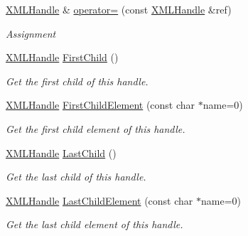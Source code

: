 \begin{DoxyCompactItemize}
\hyperlink{classtinyxml2_1_1_x_m_l_handle}{X\+M\+L\+Handle} \& \hyperlink{classtinyxml2_1_1_x_m_l_handle_a75b908322bb4b83be3281b6845252b20}{operator=} (const \hyperlink{classtinyxml2_1_1_x_m_l_handle}{X\+M\+L\+Handle} \&ref)
\begin{DoxyCompactList}\small\item\em Assignment \end{DoxyCompactList}\item 
\mbox{\label{classtinyxml2_1_1_x_m_l_handle_a536447dc7f54c0cd11e031dad94795ae}} 
\hyperlink{classtinyxml2_1_1_x_m_l_handle}{X\+M\+L\+Handle} \hyperlink{classtinyxml2_1_1_x_m_l_handle_a536447dc7f54c0cd11e031dad94795ae}{First\+Child} ()
\begin{DoxyCompactList}\small\item\em Get the first child of this handle. \end{DoxyCompactList}\item 
\mbox{\label{classtinyxml2_1_1_x_m_l_handle_a74b04dd0f15e0bf01860e282b840b6a3}} 
\hyperlink{classtinyxml2_1_1_x_m_l_handle}{X\+M\+L\+Handle} \hyperlink{classtinyxml2_1_1_x_m_l_handle_a74b04dd0f15e0bf01860e282b840b6a3}{First\+Child\+Element} (const char $\ast$name=0)
\begin{DoxyCompactList}\small\item\em Get the first child element of this handle. \end{DoxyCompactList}\item 
\mbox{\label{classtinyxml2_1_1_x_m_l_handle_a9d09f04435f0f2f7d0816b0198d0517b}} 
\hyperlink{classtinyxml2_1_1_x_m_l_handle}{X\+M\+L\+Handle} \hyperlink{classtinyxml2_1_1_x_m_l_handle_a9d09f04435f0f2f7d0816b0198d0517b}{Last\+Child} ()
\begin{DoxyCompactList}\small\item\em Get the last child of this handle. \end{DoxyCompactList}\item 
\mbox{\label{classtinyxml2_1_1_x_m_l_handle_a42cccd0ce8b1ce704f431025e9f19e0c}} 
\hyperlink{classtinyxml2_1_1_x_m_l_handle}{X\+M\+L\+Handle} \hyperlink{classtinyxml2_1_1_x_m_l_handle_a42cccd0ce8b1ce704f431025e9f19e0c}{Last\+Child\+Element} (const char $\ast$name=0)
\begin{DoxyCompactList}\small\item\em Get the last child element of this handle. \end{DoxyCompactList}\item 

\end{DoxyCompactItemize}
